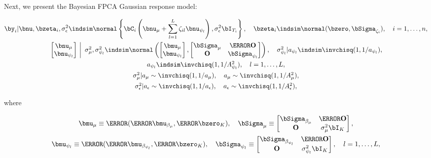 \documentclass[12pt]{article}
\def\sigsqeps{\sigma^2_{\epsilon}}
\def\aeps{a_{\epsilon}}
\def\Asqeps{A_{\epsilon}^2}
\def\sigsqmu{\sigma^2_{\mu}}
\def\amu{a_{\mu}}
\def\Asqmu{A_{\mu}^2}
\def\numu{\bnu_\mu}
\newcommand\nupsi[1]{\bnu_{\psi_{#1}}}
\newcommand\sigsqpsi[1]{\sigma^2_{\psi_{#1}}}
\newcommand\apsi[1]{a_{\psi_{#1}}}
\newcommand\Asqpsi[1]{A_{\psi_{#1}}^2}
\theoremstyle{plain}
\theoremstyle{definition}
\theoremstyle{remark}
\begin{document}
Next, we present the Bayesian FPCA Gaussian response model:

\begin{equation}
\begin{gathered}
	\by_i | \bnu, \bzeta_i, \sigsqeps \indsim \normal \left\{
		\bC_i \left( \numu + \sum_{l=1}^L \zeta_{il} \nupsi{l} \right), \sigsqeps \bI_{T_i}
	\right\}, \quad
	\bzeta_i \indsim \normal (\bzero, \bSigma_{\zeta_i}), \quad
	i = 1, \dots, n, \\
	$$
	\left.\begin{bmatrix}
		\numu \\
		\nupsi{l}
	\end{bmatrix} \ \right| \ \sigsqmu, \sigsqpsi{l}
		\indsim
			\normal \left(
				\begin{bmatrix}
					\bmu_\mu \\
					\bmu_{\psi_l} \\
				\end{bmatrix},
				\begin{bmatrix}
					\bSigma_\mu & \T{\textbf{O}} \\
					\textbf{O} & \bSigma_{\psi_l}
				\end{bmatrix}
			\right), \quad
	\sigsqpsi{l} | \apsi{l} \indsim \invchisq (1, 1/\apsi{l}), \\
	$$
	\apsi{l} \indsim \invchisq (1, 1/\Asqpsi{l}), \quad l = 1, \dots, L, \\
	$$
	\sigsqmu | \amu \sim \invchisq (1, 1/\amu), \quad \amu \sim \invchisq(1, 1/\Asqmu), \\
	$$
	\sigsqeps | \aeps \sim \invchisq (1, 1/\aeps), \quad \aeps \sim \invchisq(1, 1/\Asqeps),
\end{gathered}
\label{bayes_fpca_mod}
\end{equation}

\noindent where

\begin{equation}
\begin{gathered}
	\bmu_\mu \equiv \T{(\T{\bmu_{\beta_\mu}}, \T{\bzero_K})}, \quad
	\bSigma_\mu \equiv \begin{bmatrix}
		\bSigma_{\beta_\mu} & \T{\textbf{O}} \\
		\textbf{O} & \sigsqmu \bI_{K}
	\end{bmatrix}, \\
	$$
	\bmu_{\psi_l} \equiv \T{(\T{\bmu_{\beta_{\psi_l}}}, \T{\bzero_K})}, \quad
	\bSigma_{\psi_l} \equiv \begin{bmatrix}
		\bSigma_{\beta_{\psi_l}} & \T{\textbf{O}} \\
		\textbf{O} & \sigsqpsi{l} \bI_{K}
	\end{bmatrix}, \quad l = 1, \dots, L,
\end{gathered}
\label{sub_vecs_mats}
\end{equation}
\end{document}
